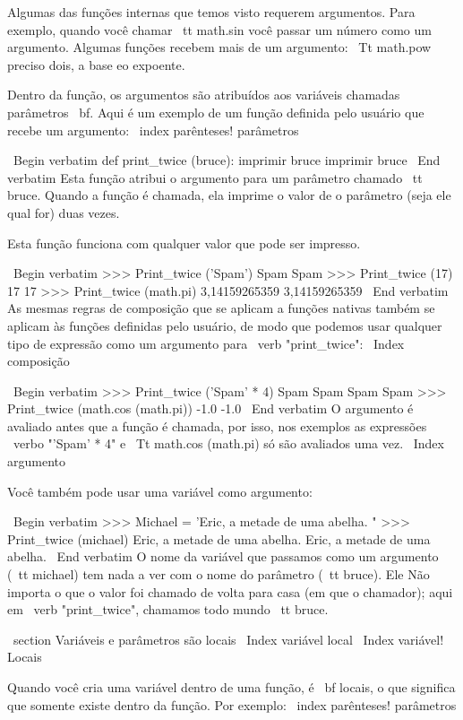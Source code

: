 \documentclass[10pt]{book}
\begin{document}
{Algumas das funções internas que temos visto requerem argumentos. Para
exemplo, quando você chamar {\ tt math.sin} você passar um número
como um argumento. Algumas funções recebem mais de um argumento:
{\ Tt math.pow} preciso dois, a base eo expoente.

Dentro da função, os argumentos são atribuídos aos
variáveis ​​chamadas parâmetros {\ bf}. Aqui é um exemplo de um
função definida pelo usuário que recebe um argumento:
\ index {parênteses! parâmetros}

\ Begin {verbatim}
def print_twice (bruce):
    imprimir bruce
    imprimir bruce
\ End {verbatim}
%
Esta função atribui o argumento para um parâmetro
chamado {\ tt bruce}. Quando a função é chamada, ela imprime o valor de
o parâmetro (seja ele qual for) duas vezes.

Esta função funciona com qualquer valor que pode ser impresso.

\ Begin {verbatim}
>>> Print_twice ('Spam')
Spam
Spam
>>> Print_twice (17)
17
17
>>> Print_twice (math.pi)
3,14159265359
3,14159265359
\ End {verbatim}
%
As mesmas regras de composição que se aplicam a funções nativas também
se aplicam às funções definidas pelo usuário, de modo que podemos usar qualquer tipo de expressão
como um argumento para \ verb "print_twice":
\ Index {composição}

\ Begin {verbatim}
>>> Print_twice ('Spam' * 4)
Spam Spam
Spam Spam
>>> Print_twice (math.cos (math.pi))
-1.0
-1.0
\ End {verbatim}
%
O argumento é avaliado antes que a função é chamada, por isso,
nos exemplos as expressões \ verbo "'Spam' * 4" e
{\ Tt math.cos (math.pi)} só são avaliados uma vez.
\ Index {argumento}

Você também pode usar uma variável como argumento:

\ Begin {verbatim}
>>> Michael = 'Eric, a metade de uma abelha. "
>>> Print_twice (michael)
Eric, a metade de uma abelha.
Eric, a metade de uma abelha.
\ End {verbatim}
%
O nome da variável que passamos como um argumento ({\ tt michael}) tem
nada a ver com o nome do parâmetro ({\ tt bruce}). Ele
Não importa o que o valor foi chamado de volta para casa (em que o chamador);
aqui em \ verb "print_twice", chamamos todo mundo {\ tt bruce}.


\ section {Variáveis ​​e parâmetros são locais}
\ Index {variável local}
\ Index {variável! Locais}

Quando você cria uma variável dentro de uma função, é {\ bf locais},
o que significa que somente
existe dentro da função. Por exemplo:
\ index {parênteses! parâmetros}

}
\end{document}
